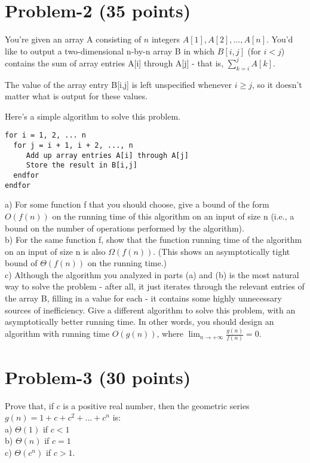 \documentclass[11pt]{article}
\begin{document}
\newpage
\section*{Problem-2 (35 points)}

You're given an array A consisting of $n$ integers $A[1], A[2],...,A[n]$. You'd like to output a two-dimensional n-by-n array B in which $B[i,j]$ (for $i < j$) contains the sum of array entries A[i] through A[j] - that is, $\sum_{k=i}^j A[k]$. 

The value of the array entry B[i,j] is left unspecified whenever $i \geq j$, so it doesn't matter what is output for these values.

Here's a simple algorithm to solve this problem.\\
\begin{verbatim}
for i = 1, 2, ... n
  for j = i + 1, i + 2, ..., n
     Add up array entries A[i] through A[j]
     Store the result in B[i,j]
  endfor
endfor
\end{verbatim}
\noindent
a) For some function f that you should choose, give a bound of the form $O(f(n))$ on the running time of this algorithm on an input of size n (i.e., a bound on the number of operations performed by the algorithm).\\
b) For the same function f, show that the function running time of the algorithm on an input of size n is also $\Omega(f(n))$. (This shows an asymptotically tight bound of $\Theta(f(n))$ on the running time.)\\
c) Although the algorithm you analyzed in parts (a) and (b) is the most natural way to solve the problem - after all, it just iterates through the relevant entries of the array B, filling in a value for each - it contains some highly unnecessary sources of inefficiency. Give a different algorithm to solve this problem, with an asymptotically better running time. In other words, you should design an algorithm with running time $O(g(n))$, where $\lim_{n \to +\infty} \frac{g(n)}{f(n)} = 0$.\\


\newpage
\section*{Problem-3 (30 points)}
Prove that, if $c$ is a positive real number, then the geometric series $g(n)= 1 + c + c^2 + \dots + c^n$ is:\\
a) $\Theta(1)$ if $c<1$\\
b) $\Theta(n)$ if $c=1$\\
c) $\Theta(c^n)$ if $c>1$.\\
\end{document}
